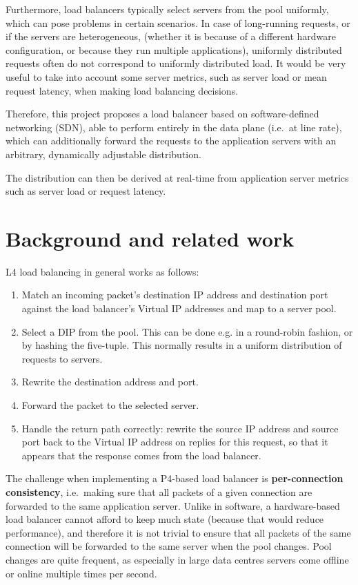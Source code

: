 \documentclass[11pt,oneside,a4paper]{article}
\begin{document}
Furthermore, load balancers typically select servers from the pool uniformly,
which can pose problems in certain scenarios.
In case of long-running requests, or if the servers are heterogeneous, (whether
it is because of a different hardware configuration, or because they run
multiple applications), uniformly distributed requests often do not correspond
to uniformly distributed load.
It would be very useful to take into account some server metrics, such as server
load or mean request latency, when making load balancing decisions.

Therefore, this project proposes a load balancer based on software-defined
networking (SDN), able to perform entirely in the data plane (i.e.~at line
rate), which can additionally forward the requests to the application servers
with an arbitrary, dynamically adjustable distribution.

The distribution can then be derived at real-time from application server
metrics such as server load or request latency.

\section{Background and related work}
L4 load balancing in general works as follows:

\begin{enumerate}
\item Match an incoming packet's destination IP address and destination port
    against the load balancer's Virtual IP addresses and map to a server pool.
\item Select a DIP from the pool.
    This can be done e.g. in a round-robin fashion, or by hashing the five-tuple.
    This normally results in a uniform distribution of requests to servers.
\item Rewrite the destination address and port.
\item Forward the packet to the selected server.
\item Handle the return path correctly: rewrite the source IP address and source
    port back to the Virtual IP address on replies for this request, so that
    it appears that the response comes from the load balancer.
\end{enumerate}

The challenge when implementing a P4-based load balancer is
\textbf{per-connection consistency}, i.e.~making sure that all packets of a
given connection are forwarded to the same application server.
Unlike in software, a hardware-based load balancer cannot afford to keep much
state (because that would reduce performance), and therefore it is not trivial
to ensure that all packets of the same connection will be forwarded to the same
server when the pool changes.
Pool changes are quite frequent, as especially in large data centres servers
come offline or online multiple times per second.\cite{googleinfra}
\end{document}
